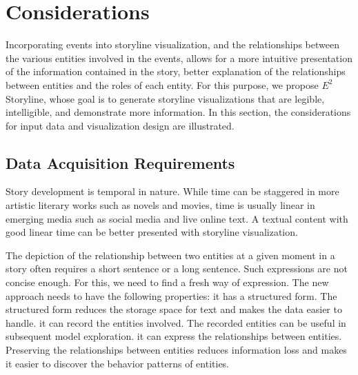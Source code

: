 \section{Considerations}
\noindent Incorporating events into storyline visualization, and the relationships between the various entities involved in the events, allows for a more intuitive presentation of the information contained in the story, better explanation of the relationships between entities and the roles of each entity. For this purpose, we propose $E^2$Storyline, whose goal is to generate storyline visualizations that are legible, intelligible, and demonstrate more information. In this section, the considerations for input data and visualization design are illustrated.

\subsection{Data Acquisition Requirements}
\noindent Story development is temporal in nature. While time can be staggered in more artistic literary works such as novels and movies, time is usually linear in emerging media such as social media and live online text. A textual content with good linear time can be better presented with storyline visualization.  

The depiction of the relationship between two entities at a given moment in a story often requires a short sentence or a long sentence. Such expressions are not concise enough. For this, we need to find a fresh way of expression. The new approach needs to have the following properties:  it has a structured form. The structured form reduces the storage space for text and makes the data easier to handle.  it can record the entities involved. The recorded entities can be useful in subsequent model exploration.  it can express the relationships between entities. Preserving the relationships between entities reduces information loss and makes it easier to discover the behavior patterns of entities.


